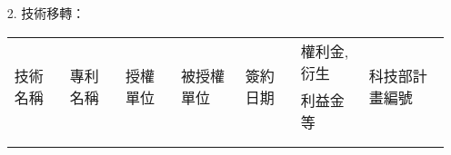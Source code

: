 \documentclass[12pt,a4paper,openany]{article}
\begin{document}
\begin{enumerate}
\begin{itemize}
  \item[2.] 技術移轉：
   \begin{table}[h!]
   \centering
   \begin{tabular}{|l|l|l|l|l|l|l|}
   \hline
   \multirow{2}{*}{技術名稱} & \multirow{2}{*}{專利名稱} & \multirow{2}{*}{授權單位} & \multirow{2}{*}{被授權單位} & \multirow{2}{*}{簽約日期}  & 權利金,衍生 & \multirow{2}{*}{科技部計畫編號} \\ 
    &   &  &  &  &   利益金等 &    \\ \hline
    &  &  &  &  &  &     \\ \hline
    &  &  &  &  &  &     \\ \hline
 
   \end{tabular}
   \end{table}
 \end{itemize}
 
 
\end{enumerate}
 



 

\label{LastPage}
\end{document}
